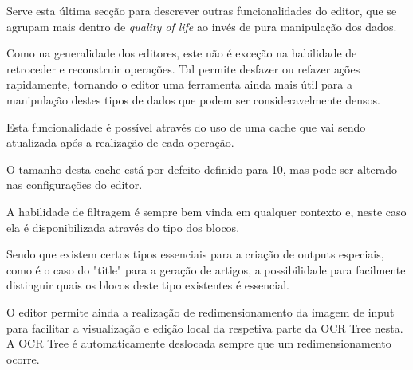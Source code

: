 Serve esta última secção para descrever outras funcionalidades do editor, que se agrupam mais dentro de \textit{quality of life} ao invés de pura manipulação dos dados.


Como na generalidade dos editores, este não é exceção na habilidade de retroceder e reconstruir operações. Tal permite desfazer ou refazer ações rapidamente, tornando o editor uma ferramenta ainda mais útil para a manipulação destes tipos de dados que podem ser consideravelmente densos.


Esta funcionalidade é possível através do uso de uma cache que vai sendo atualizada após a realização de cada operação.

O tamanho desta cache está por defeito definido para 10, mas pode ser alterado nas configurações do editor.





A habilidade de filtragem é sempre bem vinda em qualquer contexto e, neste caso ela é disponibilizada através do tipo dos blocos.

Sendo que existem certos tipos essenciais para a criação de outputs especiais, como é o caso do "title" para a geração de artigos, a possibilidade para facilmente distinguir quais os blocos deste tipo existentes é essencial. 





O editor permite ainda a realização de redimensionamento da imagem de input para facilitar a visualização e edição local da respetiva parte da OCR Tree nesta. A OCR Tree é automaticamente deslocada sempre que um redimensionamento ocorre.










